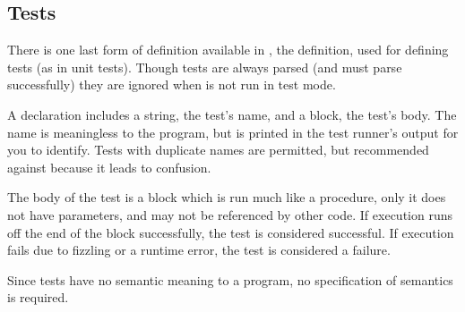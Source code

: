 \subsection{Tests}
\label{sec:tests}

There is one last form of definition available in \Trilogy{}, the 
definition, used for defining tests (as in unit tests). Though tests are
always parsed (and must parse successfully) they are ignored when \Trilogy{}
is not run in test mode.

\begin{bnf*}
\end{bnf*}

A  declaration includes a string, the test's name, and a block, the
test's body. The name is meaningless to the program, but is printed in the
test runner's output for you to identify. Tests with duplicate names are permitted,
but recommended against because it leads to confusion.

The body of the test is a block which is run much like a procedure, only it
does not have parameters, and may not be referenced by other code. If execution
runs off the end of the block successfully, the test is considered successful.
If execution fails due to fizzling or a runtime error, the test is considered
a failure.

Since tests have no semantic meaning to a program, no specification of semantics
is required.
